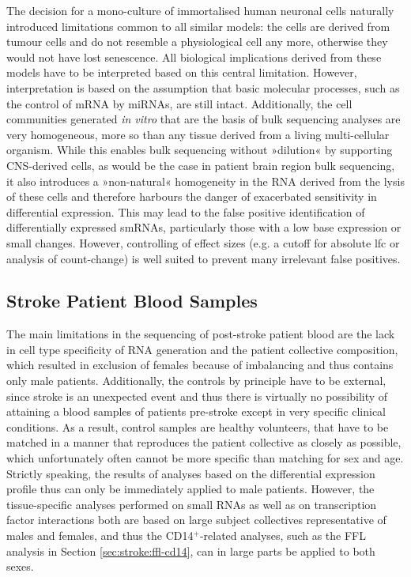 The decision for a mono-culture of immortalised human neuronal cells naturally introduced limitations common to all similar models: the cells are derived from tumour cells and do not resemble a physiological cell any more, otherwise they would not have lost senescence. All biological implications derived from these models have to be interpreted based on this central limitation. However, interpretation is based on the assumption that basic molecular processes, such as the control of mRNA by miRNAs, are still intact. Additionally, the cell communities generated \emph{in vitro} that are the basis of bulk sequencing analyses are very homogeneous, more so than any tissue derived from a living multi-cellular organism. While this enables bulk sequencing without »dilution« by supporting CNS-derived cells, as would be the case in patient brain region bulk sequencing, it also introduces a »non-natural« homogeneity in the RNA derived from the lysis of these cells and therefore harbours the danger of exacerbated sensitivity in differential expression. This may lead to the false positive identification of differentially expressed smRNAs, particularly those with a low base expression or small changes. However, controlling of effect sizes (e.g. a cutoff for absolute \ac{lfc} or analysis of count-change) is well suited to prevent many irrelevant false positives.

\subsection{Stroke Patient Blood Samples} \label{sec:discussion:stroke-blood}
The main limitations in the sequencing of post-stroke patient blood are the lack in cell type specificity of RNA generation and the patient collective composition, which resulted in exclusion of females because of imbalancing and thus contains only male patients. Additionally, the controls by principle have to be external, since stroke is an unexpected event and thus there is virtually no possibility of attaining a blood samples of patients pre-stroke except in very specific clinical conditions. As a result, control samples are healthy volunteers, that have to be matched in a manner that reproduces the patient collective as closely as possible, which unfortunately often cannot be more specific than matching for sex and age. Strictly speaking, the results of analyses based on the differential expression profile thus can only be immediately applied to male patients. However, the tissue-specific analyses performed on small RNAs as well as on transcription factor interactions both are based on large subject collectives representative of males and females, and thus the CD14$^+$-related analyses, such as the FFL analysis in Section \ref{sec:stroke:ffl-cd14}, can in large parts be applied to both sexes.

